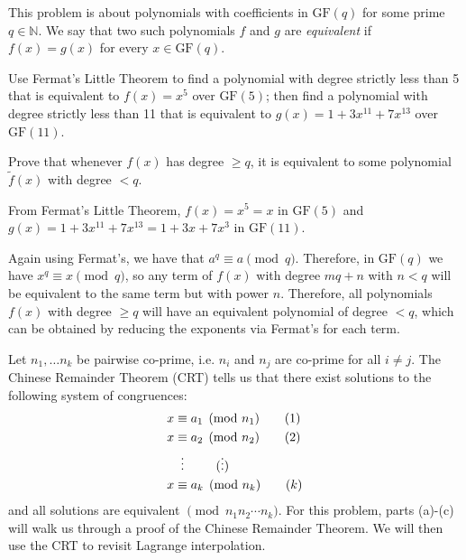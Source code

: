 \documentclass[11pt]{article}
\begin{document}
This problem is about polynomials with coefficients in $\text{GF}(q)$ for some prime $q \in \mathbb{N}$. We say that two such polynomials $f$ and $g$ are \emph{equivalent} if $f(x) = g(x)$ for every $x \in \text{GF}(q)$.

\begin{Parts}
    \Part Use Fermat's Little Theorem to find a polynomial with degree strictly less than 5 that is equivalent to $f(x) = x^5$ over $\text{GF}(5)$; then find a polynomial with degree strictly less than 11 that is equivalent to $g(x) = 1 + 3x^{11} + 7x^{13}$ over $\text{GF}(11)$.

    \Part Prove that whenever $f(x)$ has degree $\ge q$, it is equivalent to some polynomial $\tilde f(x)$ with degree $< q$.
\end{Parts}

\begin{solution}
    \begin{Parts}
        \Part From Fermat's Little Theorem, $f(x) = x^5 = \boxed{x}$ in $\text{GF}(5)$ and $g(x) = 1+3x^{11}+7x^{13} = \boxed{1+3x+7x^3}$ in $\text{GF}(11)$.
        
        \Part Again using Fermat's, we have that $a^q \equiv a \pmod q$. Therefore, in $\text{GF}(q)$ we have $x^q \equiv x \pmod q$, so any term of $f(x)$ with degree $mq+n$ with $n < q$ will be equivalent to the same term but with power $n$. Therefore, all polynomials $f(x)$ with degree $\geq q$ will have an equivalent polynomial of degree $< q$, which can be obtained by reducing the exponents via Fermat's for each term.
    \end{Parts}
\end{solution}

\newpage
{}

Let $n_1, \ldots n_k$ be pairwise co-prime, i.e. $n_i$ and $n_j$ are co-prime for all $i \neq j$. The Chinese Remainder Theorem (CRT) tells us that there exist solutions to the following system of congruences:
\begin{align}
    x &\equiv a_1 \pmod{n_1} \tag{1} \\
    x &\equiv a_2 \pmod{n_2} \tag{2} \\
    &\vdotswithin{\equiv} \tag{$\vdots$} \\
    x &\equiv a_k \pmod{n_k} \tag{$k$}
\end{align}
and all solutions are equivalent $\pmod{n_1 n_2 \cdots n_k}$. For this problem, parts (a)-(c) will walk us through a proof of the Chinese Remainder Theorem.
We will then use the CRT to revisit Lagrange interpolation.
\end{document}
